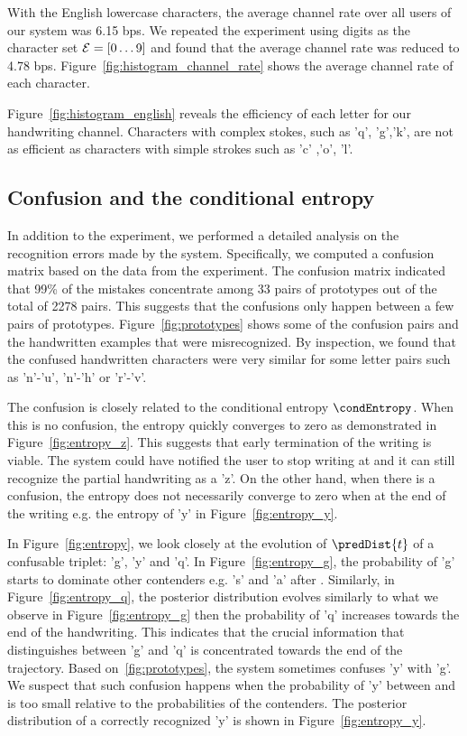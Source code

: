 \documentclass{sigchi}
\begin{document}
With the English lowercase characters, the average channel rate over
all users of our system was 6.15 bps.  We repeated the
experiment using digits as the character set $\mathcal{E} = \left[ 0
\ldots 9 \right]$ and found that the average channel rate was reduced to
4.78 bps. Figure~\ref{fig:histogram_channel_rate} shows
the average channel rate of each character. 

Figure~\ref{fig:histogram_english} reveals the efficiency of each
letter for our handwriting channel. Characters with complex stokes,
such as 'q', 'g','k', are not as efficient as characters with simple
strokes such as 'c' ,'o', 'l'. 

\subsection{Confusion and the conditional entropy}

In addition to the experiment, we performed a detailed analysis on
the recognition errors made by the system. Specifically, we computed a
confusion matrix based on the data from the experiment. The confusion
matrix indicated that 99\% of the mistakes concentrate among 33 pairs
of prototypes out of the total of 2278 pairs. This suggests that the
confusions only happen between a few pairs of
prototypes. Figure~\ref{fig:prototypes} shows some of the confusion
pairs and the handwritten examples that were misrecognized. By
inspection, we found that the confused handwritten characters were
very similar for some letter pairs such as 'n'-'u', 'n'-'h' or
'r'-'v'.

The confusion is closely related to the conditional entropy
$\condEntropy$. When this is no confusion, the entropy quickly
converges to zero as demonstrated in Figure~\ref{fig:entropy_z}. This
suggests that early termination of the writing is viable. The system
could have notified the user to stop writing at  and it can
still recognize the partial handwriting as a 'z'. On the other hand,
when there is a confusion, the entropy does not necessarily converge
to zero when at the end of the writing e.g. the entropy of 'y' in
Figure~\ref{fig:entropy_y}.

In Figure~\ref{fig:entropy}, we look closely at the evolution of
$\predDist{t}$ of a confusable triplet: 'g', 'y' and 'q'. In
Figure~\ref{fig:entropy_g}, the probability of 'g' starts to dominate
other contenders e.g. 's' and 'a' after . Similarly, in
Figure~\ref{fig:entropy_q}, the posterior distribution evolves
similarly to what we observe in Figure~\ref{fig:entropy_g} then the
probability of 'q' increases towards the end of the handwriting. This
indicates that the crucial information that distinguishes between 'g'
and 'q' is concentrated towards the end of the trajectory. Based
on~\ref{fig:prototypes}, the system sometimes confuses 'y' with 'g'. We
suspect that such confusion happens when the probability of 'y' between
 and  is too small relative to the probabilities of the
contenders. The posterior distribution of a correctly recognized 'y'
is shown in Figure~\ref{fig:entropy_y}.
\end{document}

